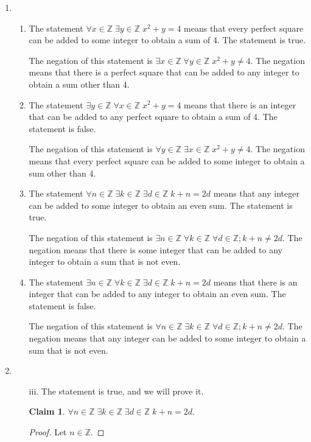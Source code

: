 \documentclass{article}
\newcommand{\Z}{\mathbb{Z}}
\newtheorem*{claim}{Claim}
\theoremstyle{definition}
\begin{document}
\begin{solution}
\begin{enumerate}
    \item\begin{enumerate}
        \item The statement $\forall x\in\Z\;\exists y\in\Z\;x^2+y=4$ means that every perfect square can be added to some integer to obtain a sum of 4. The statement is true.
        
        The negation of this statement is $\exists x\in\Z\;\forall y\in\Z\;x^2+y\neq 4$. The negation means that there is a perfect square that can be added to any integer to obtain a sum other than 4.
        \item The statement $\exists y\in\Z\;\forall x\in\Z\;x^2+y=4$ means that there is an integer that can be added to any perfect square to obtain a sum of 4. The statement is false.

        The negation of this statement is $\forall y\in\Z\;\exists x\in\Z\;x^2+y\neq 4$. The negation means that every perfect square can be added to some integer to obtain a sum other than 4.
        \item The statement $\forall n\in\Z\;\exists k\in\Z\;\exists d\in\Z\;k+n=2d$ means that any integer can be added to some integer to obtain an even sum. The statement is true.

        The negation of this statement is $\exists n\in\Z\;\forall k\in\Z\;\forall d\in\Z;k+n\neq 2d$. The negation means that there is some integer that can be added to any integer to obtain a sum that is not even.
        \item The statement $\exists n\in\Z\;\forall k\in\Z\;\exists d\in\Z\;k+n=2d$ means that there is an integer that can be added to any integer to obtain an even sum. The statement is false.

        The negation of this statement is $\forall n\in\Z\;\exists k\in\Z\;\forall d\in\Z;k+n\neq 2d$. The negation means that any integer can be added to some integer to obtain a sum that is not even.
    \end{enumerate}
    \item\begin{enumerate}
        \item[iii.] The statement is true, and we will prove it.
        \begin{claim}
        $\forall n\in\Z\;\exists k\in\Z\;\exists d\in\Z\;k+n=2d.$
        \end{claim}
        \begin{proof}
        Let $n\in\Z$.
        

\end{proof}
\end{enumerate}
\end{enumerate}
\end{solution}
\end{document}
